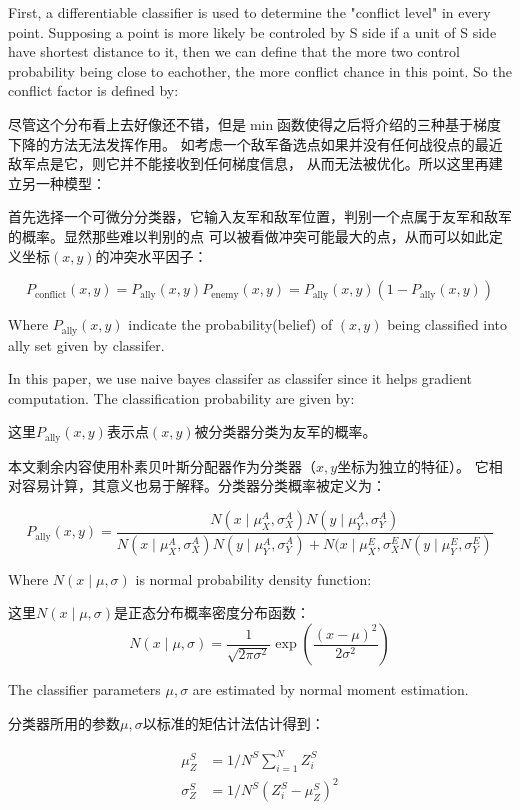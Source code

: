 \documentclass{article}
\begin{document}
First, a differentiable classifier is used to determine the "conflict level" in every point.
Supposing a point is more likely be controled by S side 
if a unit of S side have shortest distance to it, then we can define that the more two control probability 
being close to eachother, the more conflict chance in this point. So the conflict factor is defined by:

尽管这个分布看上去好像还不错，但是$\min$函数使得之后将介绍的三种基于梯度下降的方法无法发挥作用。
如考虑一个敌军备选点如果并没有任何战役点的最近敌军点是它，则它并不能接收到任何梯度信息，
从而无法被优化。所以这里再建立另一种模型：

首先选择一个可微分分类器，它输入友军和敌军位置，判别一个点属于友军和敌军的概率。显然那些难以判别的点
可以被看做冲突可能最大的点，从而可以如此定义坐标$(x,y)$的冲突水平因子：

$$
P_{\text{conflict}}(x,y) = P_\text{ally}(x,y) P_\text{enemy}(x,y) = P_\text{ally}(x,y)(1-P_\text{ally}(x,y))
$$

Where $P_\text{ally}(x,y)$ indicate the probability(belief) of $(x,y)$ being classified 
into ally set given by classifer.

In this paper, we use naive bayes classifer as classifer since it helps gradient computation. 
The classification probability are given by:

这里$P_\text{ally}(x,y)$表示点$(x,y)$被分类器分类为友军的概率。

本文剩余内容使用朴素贝叶斯分配器作为分类器（$x,y$坐标为独立的特征）。
它相对容易计算，其意义也易于解释。分类器分类概率被定义为：

$$
P_\text{ally}(x,y) = \frac{
N(x\mid \mu^A_X ,\sigma^A_X) N(y \mid \mu^A_Y, \sigma^A_Y)
}{
N(x \mid \mu^A_X , \sigma^A_X) N(y \mid \mu^A_Y , \sigma^A_Y) + 
N(x \mid \mu^E_X , \sigma^E_X N(y \mid \mu^E_Y , \sigma^E_Y)
}
$$

Where $N(x \mid \mu,\sigma)$ is normal probability density function:

这里$N(x \mid \mu,\sigma)$是正态分布概率密度分布函数：
$$
N(x \mid \mu,\sigma) = \frac{1}{\sqrt{2\pi \sigma^2}} \exp\left(\frac{(x-\mu)^2}{2\sigma^2}\right)
$$

The classifier parameters $\mu,\sigma$ are estimated by normal moment estimation. 

分类器所用的参数$\mu,\sigma$以标准的矩估计法估计得到：

\begin{align*}
\mu_Z^S    &= 1/N^S \sum_{i=1}^N Z_i^S \\
\sigma_Z^S &= 1/N^S (Z_i^S - \mu_Z^S)^2
\end{align*}
\end{document}
